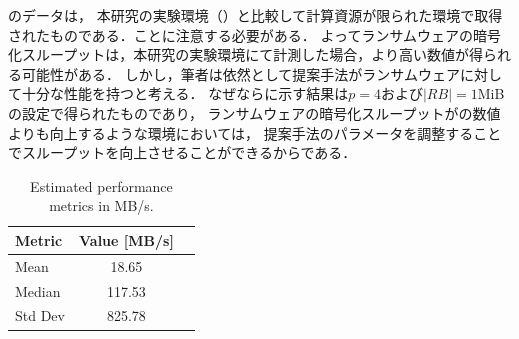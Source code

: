 のデータは，
本研究の実験環境（）と比較して計算資源が限られた環境で取得されたものである．ことに注意する必要がある．
よってランサムウェアの暗号化スループットは，本研究の実験環境にて計測した場合，より高い数値が得られる可能性がある．
しかし，筆者は依然として提案手法がランサムウェアに対して十分な性能を持つと考える．
なぜならに示す結果は$p = 4$および$|RB| = 1$MiBの設定で得られたものであり，
ランサムウェアの暗号化スループットがの数値よりも向上するような環境においては，
提案手法のパラメータを調整することでスループットを向上させることができるからである．


\begin{table}[t]
  \centering
  \caption{Estimated performance metrics in MB/s.}
  \begin{tabular}{lcc}
    \hline
    Metric  & Value [MB/s] \\
    \hline
    Mean    & 18.65        \\
    Median  & 117.53       \\
    Std Dev & 825.78       \\
    \hline
  \end{tabular}
  \label{tab:performance_metrics}
\end{table}


